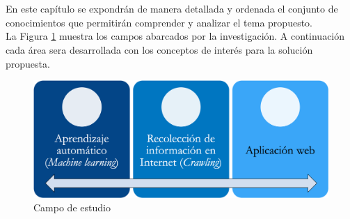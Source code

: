 
\ \\\\
En este capítulo se expondrán de manera detallada y ordenada el conjunto de conocimientos que permitirán comprender y analizar el tema propuesto. \\

La Figura \ref{fig:MarcoT} muestra los campos abarcados por la investigación.
A continuación cada área sera desarrollada con los conceptos de interés para la solución propuesta.

\begin{figure}[H]
	\centering
	\includegraphics[scale=.35]{imagenes/Capitulo3/Marco.png}
	\caption{Campo de estudio}
	\label{fig:MarcoT}
\end{figure}





\newpage

\newpage

